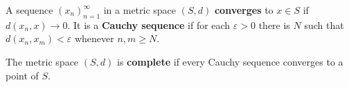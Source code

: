 A sequence $(x_n)_{n=1}^{\infty}$ in a metric space $(S, d)$ \textbf{converges} to $x \in S$ if $d(x_n, x) \to 0$. It is a \textbf{Cauchy sequence} if for each $\varepsilon > 0$ there is $N$ such that $d(x_n, x_m) < \varepsilon$ whenever $n, m \geq N$.

The metric space $(S, d)$ is \textbf{complete} if every Cauchy sequence converges to a point of $S$.
